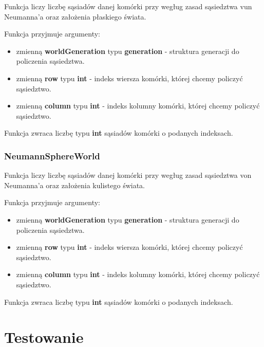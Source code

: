 \documentclass[a4paper]{article}
\begin{document}
\quad Funkcja liczy liczb\k{e} s\k{a}siad\'ow danej kom\'orki przy weg\l{}ug zasad s\k{a}siedztwa vun Neumanna'a oraz za\l{}o\.zenia p\l{}askiego \'swiata.

Funkcja przyjmuje argumenty:

\begin{itemize}
        \item zmienn\k{a} \textbf{worldGeneration} typu \textbf{generation} - struktura generacji do policzenia s\k{a}siedztwa.
        \item zmienn\k{a} \textbf{row} typu \textbf{int} - indeks wiersza kom\'orki, kt\'orej chcemy policzy\'c s\k{a}siedztwo.
        \item zmienn\k{a} \textbf{column} typu \textbf{int} - indeks kolumny kom\'orki, kt\'orej chcemy policzy\'c s\k{a}siedztwo.
\end{itemize}

\quad Funkcja zwraca liczb\k{e} typu \textbf{int} s\k{a}siad\'ow kom\'orki o podanych indeksach.


\subsubsection{NeumannSphereWorld}

\quad Funkcja liczy liczb\k{e} s\k{a}siad\'ow danej kom\'orki przy weg\l{}ug zasad s\k{a}siedztwa von Neumanna'a oraz za\l{}o\.zenia kulistego \'swiata.

Funkcja przyjmuje argumenty:

\begin{itemize}
        \item zmienn\k{a} \textbf{worldGeneration} typu \textbf{generation} - struktura generacji do policzenia s\k{a}siedztwa.
        \item zmienn\k{a} \textbf{row} typu \textbf{int} - indeks wiersza kom\'orki, kt\'orej chcemy policzy\'c s\k{a}siedztwo.
        \item zmienn\k{a} \textbf{column} typu \textbf{int} - indeks kolumny kom\'orki, kt\'orej chcemy policzy\'c s\k{a}siedztwo.
\end{itemize}

\quad Funkcja zwraca liczb\k{e} typu \textbf{int} s\k{a}siad\'ow kom\'orki o podanych indeksach.



\section{Testowanie}
\end{document}
